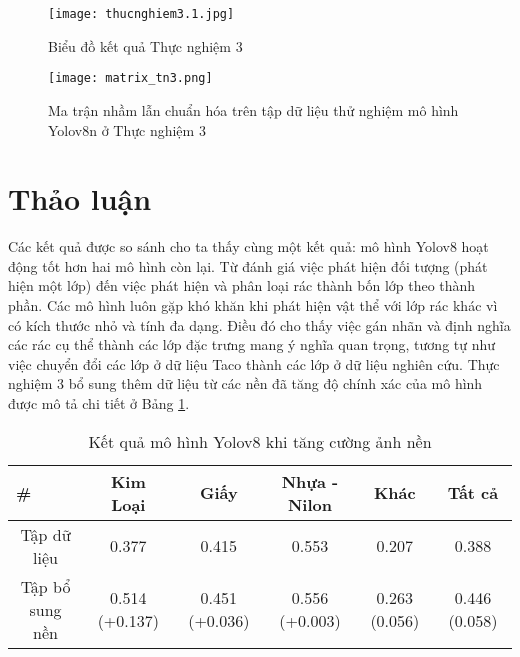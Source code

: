 \documentclass[../the.tex]{subfiles}
\begin{document}
\begin{figure}[H]
    \centering
    \texttt{[image: thucnghiem3.1.jpg]}
    \caption{Biểu đồ kết quả Thực nghiệm 3}
    \label{fig:thucnghiem3}
\end{figure}

\begin{figure}[H]
    \centering
    \texttt{[image: matrix\_tn3.png]}
    \caption{Ma trận nhầm lẫn chuẩn hóa trên tập dữ liệu thử nghiệm mô hình Yolov8n ở Thực nghiệm 3}
    \label{fig:thucnghiem3.1}
\end{figure}


\section{Thảo luận}
 {\fontsize{13}{12} \selectfont
  Các kết quả được so sánh cho ta thấy cùng một kết quả: mô hình Yolov8 hoạt động tốt hơn hai mô hình còn lại.
  Từ đánh giá việc phát hiện đối tượng (phát hiện một lớp) đến việc phát hiện và phân loại rác thành bốn lớp theo thành phần.
  Các mô hình luôn gặp khó khăn khi phát hiện vật thể với lớp rác khác vì có kích thước nhỏ và tính đa dạng.
  Điều đó cho thấy việc gán nhãn và định nghĩa các rác cụ thể thành các lớp đặc trưng mang ý nghĩa quan trọng,
  tương tự như việc chuyển đổi các lớp ở dữ liệu Taco thành các lớp ở dữ liệu nghiên cứu.
  Thực nghiệm 3 bổ sung thêm dữ liệu từ các nền đã tăng độ chính xác của mô hình được mô tả chi tiết ở Bảng \ref{tab:thaoluan1}.
 }

\begin{table}[h!]
    \centering
    \caption{Kết quả mô hình Yolov8 khi tăng cường ảnh nền}
    \begin{tabular}{|c|c|c|c|c|c|}
        \hline
        \multicolumn{1}{|l|}{\textbf{\#}} & \textbf{Kim Loại} & \textbf{Giấy} & \textbf{Nhựa - Nilon} & \textbf{Khác} & \textbf{Tất cả} \\ \hline
        Tập dữ liệu                       & 0.377             & 0.415         & 0.553                 & 0.207         & 0.388           \\ \hline
        Tập bổ sung   nền                 & 0.514 \newline (+0.137)     & 0.451 \newline(+0.036) & 0.556 \newline(+0.003)         & 0.263 \newline(0.056)  & 0.446 \newline(0.058)    \\ \hline
    \end{tabular}
    \label{tab:thaoluan1}
\end{table}
\end{document}
